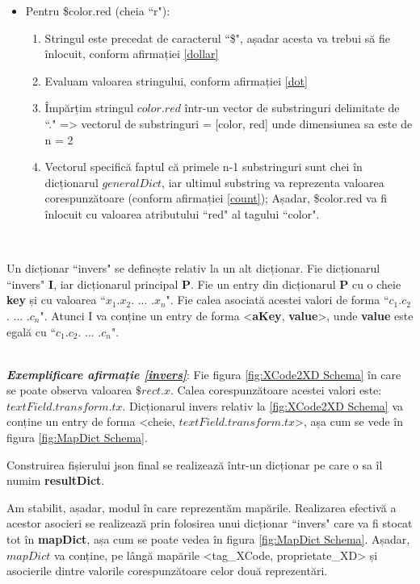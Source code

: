 \begin{itemize} \label{modalitate}
\item Pentru \$color.red (cheia ``r"): 
\begin{enumerate}
\item Stringul este precedat de caracterul ``\$", așadar acesta va trebui să fie înlocuit, conform afirmației \ref{dollar}
\item Evaluam valoarea stringului, conform afirmației \ref{dot}
\item Împărțim stringul $color.red$ într-un vector de substringuri delimitate de ``." => vectorul de substringuri = [color, red] unde dimensiunea sa este de n = 2
\item Vectorul specifică faptul că primele n-1 substringuri sunt chei în dicționarul $generalDict$, iar ultimul substring va reprezenta valoarea corespunzătoare (conform afirmației \ref{count}); Așadar, \$color.red va fi înlocuit cu valoarea atributului ``red" al tagului ``color".\\
\end{enumerate}
\end{itemize}

\\
\begin{mydef} \label{invers}
Un dicționar ``invers" se definește relativ la un alt dicționar. 
Fie dicționarul ``invers" \textbf{I}, iar dicționarul principal \textbf{P}. 
Fie un entry din dicționarul \textbf{P} cu o cheie \textbf{key} și cu valoarea ``$x_1$.$x_2$. ... .$x_n$".
Fie calea asociată acestei valori de forma ``$c_1$.$c_2$. ... .$c_n$".
Atunci I va conține un entry de forma <\textbf{aKey}, \textbf{value}>, unde \textbf{value} este egală cu ``$c_1$.$c_2$. ... .$c_n$".
\end{mydef}
\\
\textbf{\textit{Exemplificare afirmație \ref{invers}}}: Fie figura \ref{fig:XCode2XD Schema} în care se poate observa valoarea $\$rect.x$. Calea corespunzătoare acestei valori este: $textField.transform.tx$. Dicționarul invers relativ la \ref{fig:XCode2XD Schema} va conține un entry de forma <cheie, $textField.transform.tx$>, așa cum se vede în figura \ref{fig:MapDict Schema}. 
\\
\begin{myNote}
Construirea fișierului json final se realizează într-un dicționar pe care o sa îl numim \textbf{resultDict}.
\end{myNote}

Am stabilit, așadar, modul în care reprezentăm mapările. Realizarea efectivă a acestor asocieri se realizează prin folosirea unui dicționar ``invers" care va fi stocat tot în \textbf{mapDict}, așa cum se poate vedea în figura \ref{fig:MapDict Schema}. Așadar, $mapDict$ va conține, pe lângă mapările <tag_XCode, proprietate_XD> și asocierile dintre valorile corespunzătoare celor două reprezentări.

